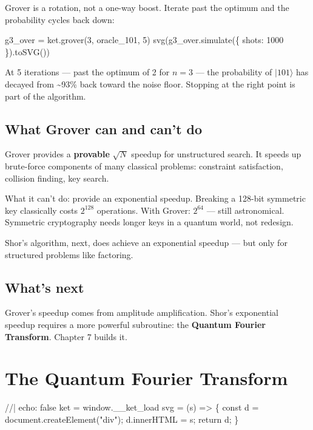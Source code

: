 \documentclass[
  11pt,
  letterpaper,
  oneside]{scrbook}
\newenvironment{Shaded}{\begin{snugshade}}{\end{snugshade}}
\newcommand{\NormalTok}[1]{\textcolor[rgb]{0.00,0.23,0.31}{#1}}
\begin{document}
Grover is a rotation, not a one-way boost. Iterate past the optimum and
the probability cycles back down:

\begin{Shaded}
\begin{Highlighting}[]
\NormalTok{g3\_over = ket.grover(3, oracle\_101, 5)}
\NormalTok{svg(g3\_over.simulate(\{ shots: 1000 \}).toSVG())}
\end{Highlighting}
\end{Shaded}

At 5 iterations --- past the optimum of 2 for \(n=3\) --- the
probability of \(|101\rangle\) has decayed from \textasciitilde93\% back
toward the noise floor. Stopping at the right point is part of the
algorithm.

\section{What Grover can and can't
do}\label{what-grover-can-and-cant-do}

Grover provides a \textbf{provable} \(\sqrt{N}\) speedup for
unstructured search. It speeds up brute-force components of many
classical problems: constraint satisfaction, collision finding, key
search.

What it can't do: provide an exponential speedup. Breaking a 128-bit
symmetric key classically costs \(2^{128}\) operations. With Grover:
\(2^{64}\) --- still astronomical. Symmetric cryptography needs longer
keys in a quantum world, not redesign.

Shor's algorithm, next, does achieve an exponential speedup --- but only
for structured problems like factoring.

\section{What's next}\label{whats-next-5}

Grover's speedup comes from amplitude amplification. Shor's exponential
speedup requires a more powerful subroutine: the \textbf{Quantum Fourier
Transform}. Chapter 7 builds it.

\chapter{The Quantum Fourier Transform}\label{sec-qft}

\begin{Shaded}
\begin{Highlighting}[]
\NormalTok{//| echo: false}
\NormalTok{ket = window.\_\_ket\_load}
\NormalTok{svg = (s) =\textgreater{} \{ const d = document.createElement("div"); d.innerHTML = s; return d; \}}
\end{Highlighting}
\end{Shaded}
\end{document}
